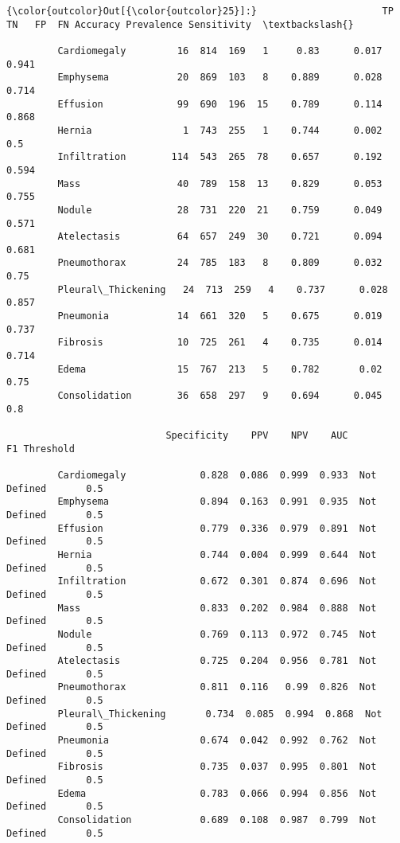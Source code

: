 \documentclass[11pt]{article}
\begin{document}
\begin{Verbatim}[commandchars=\\\{\}]
{\color{outcolor}Out[{\color{outcolor}25}]:}                      TP   TN   FP  FN Accuracy Prevalence Sensitivity  \textbackslash{}
                                                                                 
         Cardiomegaly         16  814  169   1     0.83      0.017       0.941   
         Emphysema            20  869  103   8    0.889      0.028       0.714   
         Effusion             99  690  196  15    0.789      0.114       0.868   
         Hernia                1  743  255   1    0.744      0.002         0.5   
         Infiltration        114  543  265  78    0.657      0.192       0.594   
         Mass                 40  789  158  13    0.829      0.053       0.755   
         Nodule               28  731  220  21    0.759      0.049       0.571   
         Atelectasis          64  657  249  30    0.721      0.094       0.681   
         Pneumothorax         24  785  183   8    0.809      0.032        0.75   
         Pleural\_Thickening   24  713  259   4    0.737      0.028       0.857   
         Pneumonia            14  661  320   5    0.675      0.019       0.737   
         Fibrosis             10  725  261   4    0.735      0.014       0.714   
         Edema                15  767  213   5    0.782       0.02        0.75   
         Consolidation        36  658  297   9    0.694      0.045         0.8   
         
                            Specificity    PPV    NPV    AUC           F1 Threshold  
                                                                                     
         Cardiomegaly             0.828  0.086  0.999  0.933  Not Defined       0.5  
         Emphysema                0.894  0.163  0.991  0.935  Not Defined       0.5  
         Effusion                 0.779  0.336  0.979  0.891  Not Defined       0.5  
         Hernia                   0.744  0.004  0.999  0.644  Not Defined       0.5  
         Infiltration             0.672  0.301  0.874  0.696  Not Defined       0.5  
         Mass                     0.833  0.202  0.984  0.888  Not Defined       0.5  
         Nodule                   0.769  0.113  0.972  0.745  Not Defined       0.5  
         Atelectasis              0.725  0.204  0.956  0.781  Not Defined       0.5  
         Pneumothorax             0.811  0.116   0.99  0.826  Not Defined       0.5  
         Pleural\_Thickening       0.734  0.085  0.994  0.868  Not Defined       0.5  
         Pneumonia                0.674  0.042  0.992  0.762  Not Defined       0.5  
         Fibrosis                 0.735  0.037  0.995  0.801  Not Defined       0.5  
         Edema                    0.783  0.066  0.994  0.856  Not Defined       0.5  
         Consolidation            0.689  0.108  0.987  0.799  Not Defined       0.5  
\end{Verbatim}
            
\end{document}
